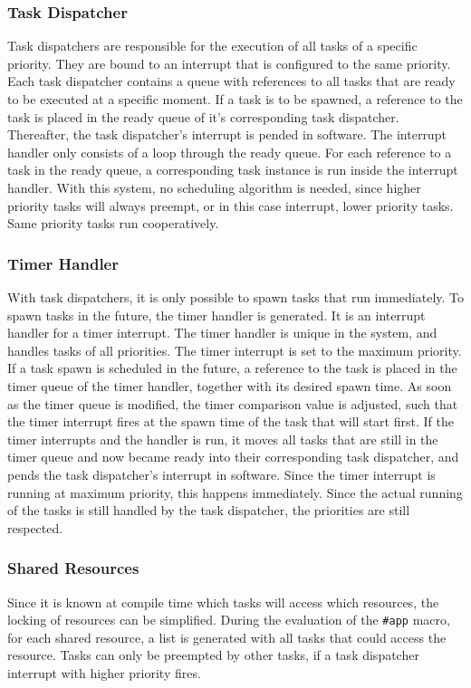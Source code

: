 \subsubsection{Task Dispatcher}
\label{sec:task_dispatcher}
Task dispatchers are responsible for the execution of all tasks of a specific priority.
They are bound to an interrupt that is configured to the same priority.
Each task dispatcher contains a queue with references to all tasks that are ready to be executed at a specific moment.
If a task is to be spawned, a reference to the task is placed in the ready queue of it's corresponding task dispatcher.
Thereafter, the task dispatcher's interrupt is pended in software. The interrupt handler only consists of a loop through the ready queue.
For each reference to a task in the ready queue, a corresponding task instance is run inside the interrupt handler.
With this system, no scheduling algorithm is needed, since higher priority tasks will always preempt, or in this case interrupt, lower priority tasks.
Same priority tasks run cooperatively.

\subsubsection{Timer Handler}
\label{sec:timer_handler}
With task dispatchers, it is only possible to spawn tasks that run immediately.
To spawn tasks in the future, the timer handler is generated. It is an interrupt handler for a timer interrupt.
The timer handler is unique in the system, and handles tasks of all priorities.
The timer interrupt is set to the maximum priority.
If a task spawn is scheduled in the future, a reference to the task is placed in the timer queue of the timer handler, together with its desired spawn time.
As soon as the timer queue is modified, the timer comparison value is adjusted, such that the timer interrupt fires at the spawn time of the task that will start first.
If the timer interrupts and the handler is run, it moves all tasks that are still in the timer queue and now became ready into their corresponding task dispatcher, and pends the task dispatcher's interrupt in software.
Since the timer interrupt is running at maximum priority, this happens immediately.
Since the actual running of the tasks is still handled by the task dispatcher, the priorities are still respected.

\subsubsection{Shared Resources}
\label{sec:shared_resources}
Since it is known at compile time which tasks will access which resources, the locking of resources can be simplified.
During the evaluation of the \texttt{\#app} macro, for each shared resource, a list is generated with all tasks that could access the resource.
Tasks can only be preempted by other tasks, if a task dispatcher interrupt with higher priority fires.


